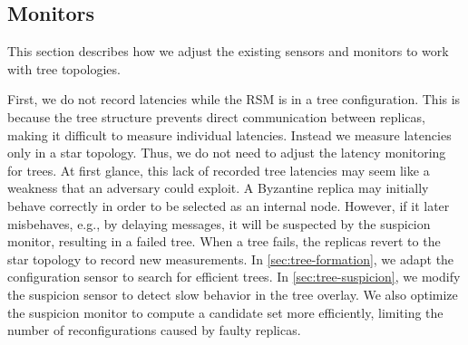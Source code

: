 \subsection{\optitree Monitors}
\label{sec:sm-trees}

This section describes how we adjust the existing sensors and monitors to work with tree topologies.

First, we do not record latencies while the RSM is in a tree configuration.
This is because the tree structure prevents direct communication between replicas, making it difficult to measure individual latencies.
Instead we measure latencies only in a star topology.
Thus, we do not need to adjust the latency monitoring for trees.
At first glance, this lack of recorded tree latencies may seem like a weakness that an adversary could exploit.
A Byzantine replica may initially behave correctly in order to be selected as an internal node.
However, if it later misbehaves, e.g., by delaying messages, it will be suspected by the suspicion monitor, resulting in a failed tree.
When a tree fails, the replicas revert to the star topology to record new measurements.
In \cref{sec:tree-formation}, we adapt the configuration sensor to search for efficient trees.
In \cref{sec:tree-suspicion}, we modify the suspicion sensor to detect slow behavior in the tree overlay.
We also optimize the suspicion monitor to compute a candidate set more efficiently, limiting the number of reconfigurations caused by faulty replicas.





